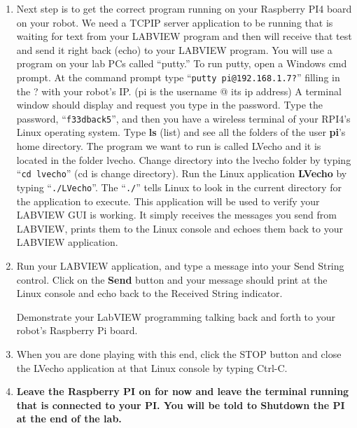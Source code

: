 \documentclass[11pt]{article}
\begin{document}
\begin{enumerate}
    \item Next step is to get the correct program running on your Raspberry PI4 board on your robot. We need a TCPIP server application to be running that is waiting for text from your LABVIEW program and then will receive that test and send it right back (echo) to your LABVIEW program. You will use a program on your lab PCs called “putty.” To run putty, open a Windows cmd prompt. At the command prompt type “\texttt{putty pi@192.168.1.7?}” filling in the ? with your robot’s IP. (pi is the username @ its ip address) A terminal window should display and request you type in the password. Type the password, “\lstinline|f33dback5|”, and then you have a wireless terminal of your RPI4’s Linux operating system. Type \textbf{ls} (list) and see all the folders of the user \textbf{pi}’s home directory. The program we want to run is called LVecho and it is located in the folder lvecho. Change directory into the lvecho folder by typing “\lstinline|cd lvecho|” (cd is change directory). Run the Linux application \textbf{LVecho} by typing “\texttt{./LVecho}”. The “\texttt{./}” tells Linux to look in the current directory for the application to execute. This application will be used to verify your LABVIEW GUI is working. It simply receives the messages you send from LABVIEW, prints them to the Linux console and echoes them back to your LABVIEW application.
    \item Run your LABVIEW application, and type a message into your Send String control. Click on the \textbf{Send} button and your message should print at the Linux console and echo back to the Received String indicator.
        \begin{checkoff}
                Demonstrate your LabVIEW programming talking back and forth to your robot’s Raspberry Pi board.
        \end{checkoff}
    \item When you are done playing with this end, click the STOP button and close the LVecho application at that Linux console by typing Ctrl-C.
    \item \textbf{Leave the Raspberry PI on for now and leave the terminal running that is connected to your PI. You will be told to Shutdown the PI at the end of the lab.}
\end{enumerate}
%
\end{document}

